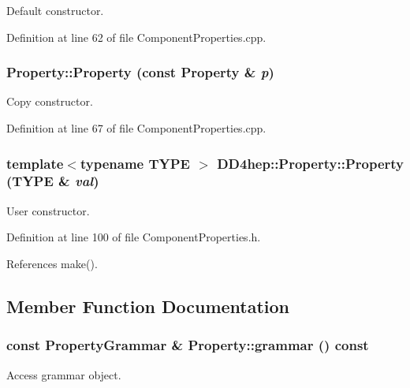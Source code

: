 Default constructor. 

Definition at line 62 of file ComponentProperties.cpp.\hypertarget{class_d_d4hep_1_1_property_a357f17ec828b8fda35378db74fd3a830}{
\subsubsection[{Property}]{\setlength{\rightskip}{0pt plus 5cm}Property::Property (const {\bf Property} \& {\em p})}}
\label{class_d_d4hep_1_1_property_a357f17ec828b8fda35378db74fd3a830}


Copy constructor. 

Definition at line 67 of file ComponentProperties.cpp.\hypertarget{class_d_d4hep_1_1_property_a17226fd5a43561fae28b9a343f410c49}{
\subsubsection[{Property}]{\setlength{\rightskip}{0pt plus 5cm}template$<$typename TYPE $>$ DD4hep::Property::Property (TYPE \& {\em val})}}
\label{class_d_d4hep_1_1_property_a17226fd5a43561fae28b9a343f410c49}


User constructor. 

Definition at line 100 of file ComponentProperties.h.

References make().

\subsection{Member Function Documentation}
\hypertarget{class_d_d4hep_1_1_property_ac9688a8f6daf76e38d9cce39e649512b}{
\subsubsection[{grammar}]{\setlength{\rightskip}{0pt plus 5cm}const {\bf PropertyGrammar} \& Property::grammar () const}}
\label{class_d_d4hep_1_1_property_ac9688a8f6daf76e38d9cce39e649512b}


Access grammar object. 

